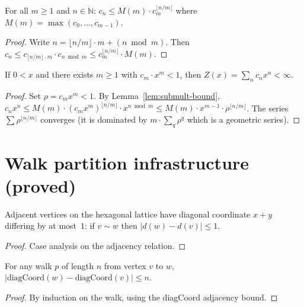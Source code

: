 \begin{lemma}
\begin{enumerate}
\begin{lemma}\label{lem:submult-bound}
\leanok
{}
  For all $m \geq 1$ and $n \in \mathbb{N}$:
  $c_n \leq M(m) \cdot c_m^{\lfloor n/m \rfloor}$
  where $M(m) = \max(c_0, \ldots, c_{m-1})$.
\end{lemma}
\begin{proof}\leanok
  Write $n = \lfloor n/m \rfloor \cdot m + (n \bmod m)$. Then
  $c_n \leq c_{\lfloor n/m\rfloor \cdot m} \cdot c_{n \bmod m}
  \leq c_m^{\lfloor n/m\rfloor} \cdot M(m)$.
\end{proof}

\begin{theorem}\label{thm:summable-root}
\leanok
{}
  If $0 < x$ and there exists $m \geq 1$ with $c_m \cdot x^m < 1$,
  then $Z(x) = \sum_n c_n x^n < \infty$.
\end{theorem}
\begin{proof}\leanok
  Set $\rho = c_m x^m < 1$. By Lemma~\ref{lem:submult-bound},
  $c_n x^n \leq M(m) \cdot (c_m x^m)^{\lfloor n/m \rfloor} \cdot x^{n \bmod m}
  \leq M(m) \cdot x^{m-1} \cdot \rho^{\lfloor n/m \rfloor}$.
  The series $\sum \rho^{\lfloor n/m \rfloor}$ converges (it is
  dominated by $m \cdot \sum_q \rho^q$ which is a geometric series).
\end{proof}

\section{Walk partition infrastructure (proved)}\label{sec:walk-partition}

\begin{lemma}\label{lem:diagcoord-adj}
\leanok
{}
  Adjacent vertices on the hexagonal lattice have diagonal coordinate
  $x + y$ differing by at most~$1$: if $v \sim w$ then $|d(w) - d(v)| \leq 1$.
\end{lemma}
\begin{proof}\leanok
  Case analysis on the adjacency relation.
\end{proof}

\begin{lemma}\label{lem:walk-diagcoord-bound}
\leanok
{}
  For any walk $p$ of length $n$ from vertex $v$ to $w$,
  $|\mathrm{diagCoord}(w) - \mathrm{diagCoord}(v)| \leq n$.
\end{lemma}
\begin{proof}\leanok
  By induction on the walk, using the diagCoord adjacency bound.
\end{proof}


\end{enumerate}
\end{lemma}

